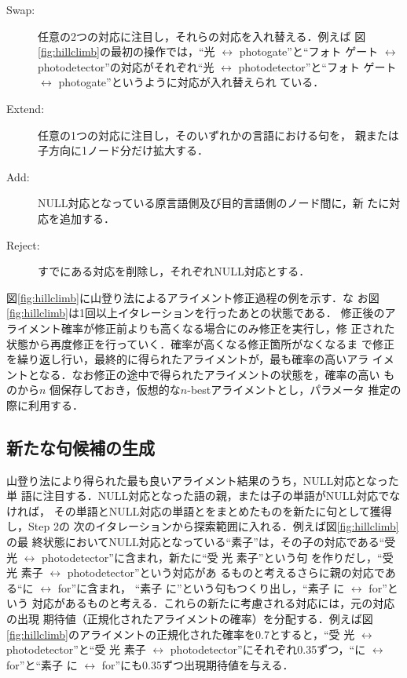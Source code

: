 \documentclass[japanese]{jnlp_1.4}
\begin{document}
\begin{description}
 \item[Swap:] 任意の2つの対応に注目し，それらの対応を入れ替える．例えば
	    図\ref{fig:hillclimb}の最初の操作では，``光 
	    $\leftrightarrow$ photogate''と``フォト ゲート 
	    $\leftrightarrow$ photodetector''の対応がそれぞれ``光 
	    $\leftrightarrow$ photodetector''と``フォト ゲート 
	    $\leftrightarrow$ photogate''というように対応が入れ替えられ
	    ている．
 \item[Extend:] 任意の1つの対応に注目し，そのいずれかの言語における句を，
	    親または子方向に1ノード分だけ拡大する．
 \item[Add:] NULL対応となっている原言語側及び目的言語側のノード間に，新
	    たに対応を追加する．
 \item[Reject:] すでにある対応を削除し，それぞれNULL対応とする．
\end{description}

図\ref{fig:hillclimb}に山登り法によるアライメント修正過程の例を示す．な
お図\ref{fig:hillclimb}は1回以上イタレーションを行ったあとの状態である．
修正後のアライメント確率が修正前よりも高くなる場合にのみ修正を実行し，修
正された状態から再度修正を行っていく．確率が高くなる修正箇所がなくなるま
で修正を繰り返し行い，最終的に得られたアライメントが，最も確率の高いアラ
イメントとなる．なお修正の途中で得られたアライメントの状態を，確率の高い
ものから$n$ 個保存しておき，仮想的な$n$-bestアライメントとし，パラメータ
推定の際に利用する．




\subsection*{新たな句候補の生成}
\label{expand_step}

山登り法により得られた最も良いアライメント結果のうち，NULL対応となった単
語に注目する．NULL対応となった語の親，または子の単語がNULL対応でなければ，
その単語とNULL対応の単語とをまとめたものを新たに句として獲得し，Step 2の
次のイタレーションから探索範囲に入れる．例えば図\ref{fig:hillclimb}の最
終状態においてNULL対応となっている“素子”は，その子の対応である“受 光 
$\leftrightarrow$ photodetector”に含まれ，新たに“受 光 素子”という句
を作りだし，“受 光 素子 $\leftrightarrow$ photodetector”という対応があ
るものと考えるさらに親の対応である“に $\leftrightarrow$ for”に含まれ，
“素子 に”という句もつくり出し，“素子 に $\leftrightarrow$ for”という
対応があるものと考える．これらの新たに考慮される対応には，元の対応の出現
期待値（正規化されたアライメントの確率）を分配する．例えば図
\ref{fig:hillclimb}のアライメントの正規化された確率を0.7とすると，“受 
光 $\leftrightarrow$ photodetector”と“受 光 素子 $\leftrightarrow$
photodetector”にそれぞれ0.35ずつ，“に $\leftrightarrow$ for”と“素子 
に $\leftrightarrow$ for”にも0.35ずつ出現期待値を与える．
\end{document}
